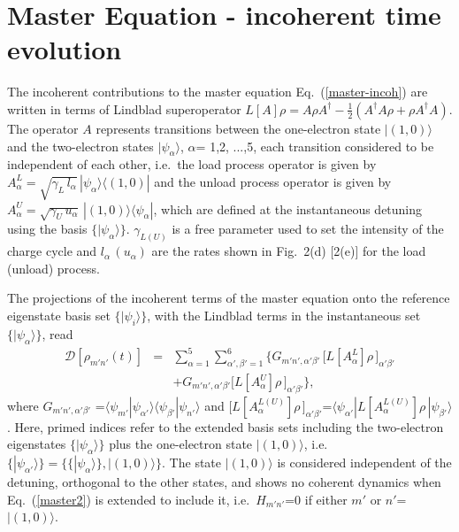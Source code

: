 \documentclass[prb,twocolumn,showpacs,floats]{revtex4}
\begin{document}
\appendix
\section{Master Equation - incoherent time evolution}
%
%
The incoherent contributions to the master equation Eq.~(\ref{master-incoh}) are written in terms
of Lindblad superoperator $L[A]\rho = A  \rho  A^{\dagger} - \frac{1}{2} 
\left( A^{\dagger}  A  \rho + \rho  A^{\dagger}  A \right)$. The operator $A$ represents
transitions between the one-electron state $| (1,0) \rangle $ and the
two-electron states  $| \psi_{\alpha} \rangle$, $\alpha$= 1,2, ...,5, 
each transition considered to be independent of each other, i.e.~the load process operator is 
given by $A^{L}_{\alpha} = \sqrt{\gamma_L \, l_{\alpha} }\, | \psi_{\alpha} \rangle \langle (1,0) |$ and the 
unload process operator is given by
 $A^{U}_{\alpha} = \sqrt{\gamma_U \, u_{\alpha}} \, | (1,0) \rangle \langle \psi_{\alpha} |$,
 which are defined at the instantaneous detuning using the basis $\{ | \psi_\alpha \rangle \}$.
 $\gamma_{L(U)}$ is a free parameter used to set the intensity of the charge cycle
 and $l_{\alpha} \, (u_{\alpha})$ are the rates shown in Fig.~2(d) [2(e)] for the load (unload) process.

The projections of the incoherent terms of the master equation onto
the reference eigenstate basis set $\{ | \psi_i \rangle \}$, with the Lindblad terms in
the instantaneous set $\{ | \psi_\alpha \rangle \}$, read
\begin{eqnarray}
\mathcal{D} \left[\rho_{m'n'}(t)\right] &=&   \sum_{\alpha=1}^{5} 
\sum_{\alpha',\beta'=1}^{6}    \Bigg\{  
 G_{m'n',\alpha'\beta'} \, \Big[ L[A^{L}_{\alpha}]\rho \, \Big]_{\alpha' \beta'}    \nonumber \\ &&
+  G_{m'n',\alpha'\beta'}
\Big[ L[A^{U}_{\alpha}]\rho \, \Big]_{\alpha' \beta'} \Bigg\}  ,
\label{inc}
\end{eqnarray}
where $G_{m'n',\alpha'\beta'}$ =$ \langle \psi_{m'} | 
\psi_{\alpha'} \rangle \langle \psi_{\beta'} | \psi_{n'} \rangle$  and 
$\Big[ L[A^{L(U)}_{\alpha}]\rho \, \Big]_{\alpha'  \beta'}$=$\langle \psi_{\alpha'} | 
L[A^{L(U)}_{\alpha}]\rho \,   |  \psi_{\beta'} \rangle$. 
Here, primed indices refer to the extended basis sets including the two-electron
eigenstates $\{ | \psi_\alpha \rangle \}$ plus the one-electron state $| (1,0) \rangle $,
i.e.~$\{ | \psi_{\alpha'} \rangle \}=\big \{  \{ | \psi_\alpha \rangle \}, | (1,0) \rangle  \big \} $.
The state $| (1,0) \rangle $ is considered independent of the detuning, orthogonal
to the other states, and shows no coherent dynamics when Eq.~(\ref{master2}) is extended
to include it, i.e.~$H_{m'n'}$=0 if either $m'$ or $n'$=$| (1,0) \rangle $.
\end{document}
